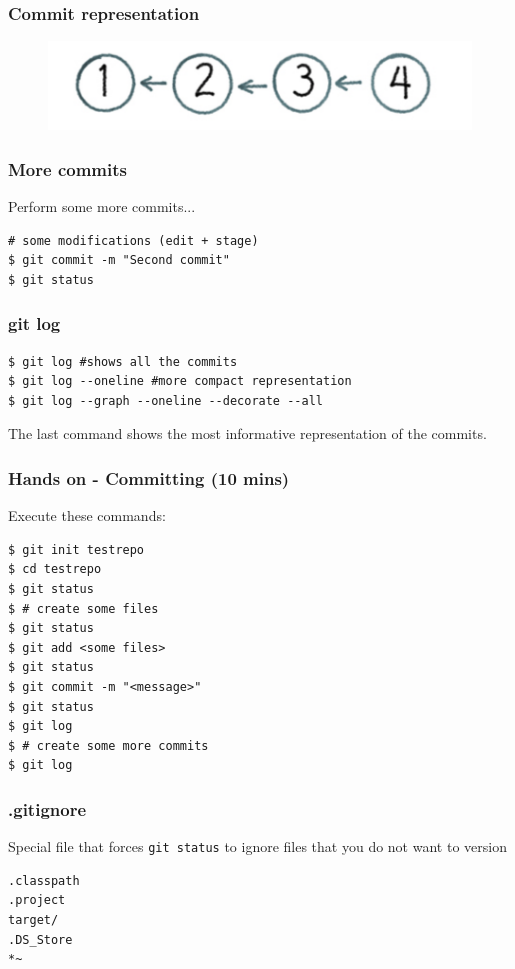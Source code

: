 \documentclass{beamer}
\begin{document}
\begin{frame}
\frametitle{Commit representation}

\begin{figure}
\includegraphics[scale=0.3]{figures/f9.png}
\end{figure}

\end{frame}



\begin{frame}[fragile]
\frametitle{More commits}

Perform some more commits...

\begin{lstlisting}
# some modifications (edit + stage)
$ git commit -m "Second commit" 
$ git status 
\end{lstlisting}
\end{frame}


\begin{frame}[fragile]
\frametitle{git log}

\begin{lstlisting}
$ git log #shows all the commits
$ git log --oneline #more compact representation
$ git log --graph --oneline --decorate --all
\end{lstlisting}

The last command shows the most informative representation of the
commits.
\end{frame}

\begin{frame}[fragile]
\frametitle{Hands on - Committing (10 mins)}

Execute these commands:

\begin{lstlisting}
$ git init testrepo
$ cd testrepo
$ git status
$ # create some files
$ git status
$ git add <some files>
$ git status
$ git commit -m "<message>"
$ git status
$ git log
$ # create some more commits
$ git log
\end{lstlisting}
\end{frame}


\begin{frame}[fragile]
\frametitle{.gitignore}

Special file that forces \texttt{git status} to ignore files that you
do not want to version
\begin{lstlisting}
.classpath
.project
target/
.DS_Store
*~
\end{lstlisting}

\end{frame}
\end{document}
